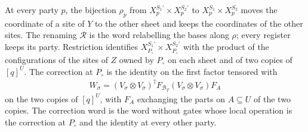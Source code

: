 \begin{definition}
    \label{def:party_exchange_words}
    \leanok
    At every party $p$, the bijection $\rho_p$ from $X^{S_1'}_p\times X^{S_2'}_p$ to
    $X^{S_1}_p\times X^{S_2}_p$ moves the coordinate of a site of $Y$ to the other sheet and keeps
    the coordinates of the other sites. The renaming $\mathcal R$ is the word relabelling the
    bases along $\rho$; every register keeps its party. Restriction identifies
    $X^{S_1'}_{P_\circ}\times X^{S_2'}_{P_\circ}$ with the product of the configurations of the
    sites of $Z$ owned by $P_\circ$ on each sheet and of two copies of $[q]^U$. The correction at
    $P_\circ$ is the identity on the first factor tensored with
    \begin{align}
        W_\sigma=(V_\sigma\otimes V_\sigma)^\dagger F_{\mathcal B_T}(V_\sigma\otimes V_\sigma)F_A
        \label{eq:party_correction}
    \end{align}
    on the two copies of $[q]^U$, with $F_A$ exchanging the parts on $A\subseteq U$ of the two
    copies. The correction word is the word without gates whose local operation is the
    correction at $P_\circ$ and the identity at every other party.
\end{definition}

